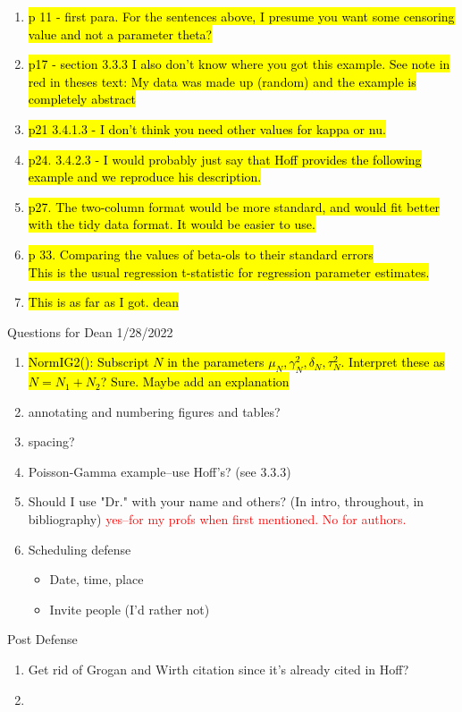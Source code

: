 \documentclass[12pt, a4paper]{article}
\begin{document}
\begin{enumerate}
  \item \hl{p 11 - first para.  For the sentences above, I presume you want some censoring value and not a parameter theta?}
  \item \hl{p17 - section 3.3.3  I also don't know where you got this example. See note in red in theses text:  My data was made up (random) and the example is completely abstract}
  \item \hl{p21 3.4.1.3 - I don't think you need other values for kappa or nu.}
  \item \hl{p24. 3.4.2.3 - I would probably just say that Hoff provides the following example and we reproduce his description.}
  \item \hl{p27. The two-column format would be more standard, and would fit better with the tidy data format.  It would be easier to use.}
  \item \hl{p 33.  Comparing the values of beta-ols to their standard errors}\\
    \hl{This is the usual regression t-statistic for regression parameter estimates.}
  \item \hl{This is as far as I got.  dean}

\end{enumerate}

{\huge Questions for Dean 1/28/2022}
\begin{enumerate}
  \item \hl{NormIG2():  Subscript $N$ in the parameters $\mu_N,\gamma^2_N,\delta_N,\tau^2_N$. Interpret these as $N = N_1 + N_2$?  Sure.  Maybe add an explanation}
  \item annotating and numbering figures and tables?
  \item spacing?
  \item Poisson-Gamma example--use Hoff's? (see 3.3.3)
  \item Should I use "Dr." with  your name and others? (In intro, throughout, in bibliography) \textcolor{red}{yes--for my profs when first mentioned.  No for authors.}
  \item Scheduling defense
  \begin{itemize}
    \item Date, time, place
    \item Invite people (I'd rather not)
  \end{itemize}
\end{enumerate}





{\huge Post Defense}

\begin{enumerate}
  \item Get rid of Grogan and Wirth citation since it's already cited in Hoff?
  \item
\end{enumerate}
\end{document}

